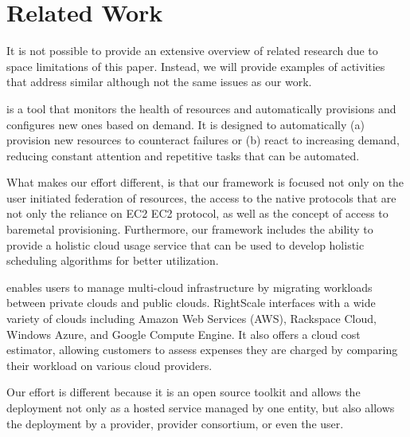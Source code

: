 \documentclass{tex/sig-alternate-2013}
\begin{document}
\section{Related Work}\label{S:related}


It is not possible to provide an extensive overview of related
research due to space limitations of this paper. Instead, we will
provide examples of activities that address similar although not the
same issues as our work.

\begin{description}[leftmargin=0pt,itemsep=0pt,topsep=0pt]

\item[Phantom] \cite{phantom12} is a tool that monitors
  the health of resources and automatically provisions and configures
  new ones based on demand. It is designed to automatically (a)
  provision new resources to counteract failures or (b) react to
  increasing demand, reducing constant attention and repetitive tasks
  that can be automated.  

  What makes our effort different, is that our framework is focused
  not only on the user initiated federation of resources, the access
  to the native protocols that are not only the reliance on EC2 EC2
  protocol, as well as the concept of access to baremetal
  provisioning. Furthermore, our framework includes the ability to
  provide a holistic cloud usage service that can be used to develop
  holistic scheduling algorithms for better utilization.

\item[RightScale] \cite{Rightscale} enables users to manage multi-cloud infrastructure by migrating workloads between private clouds and public clouds. RightScale interfaces with a wide variety of clouds including Amazon Web Services (AWS), Rackspace Cloud, Windows Azure, and Google Compute Engine. It also offers a cloud cost estimator, allowing customers to assess expenses they are charged by comparing their workload on various cloud providers.

Our effort is different because it is an open source toolkit and allows the deployment not only as a hosted service managed by one entity, but also allows the deployment by a provider, provider consortium, or even the user. 


\end{description}
\end{document}
